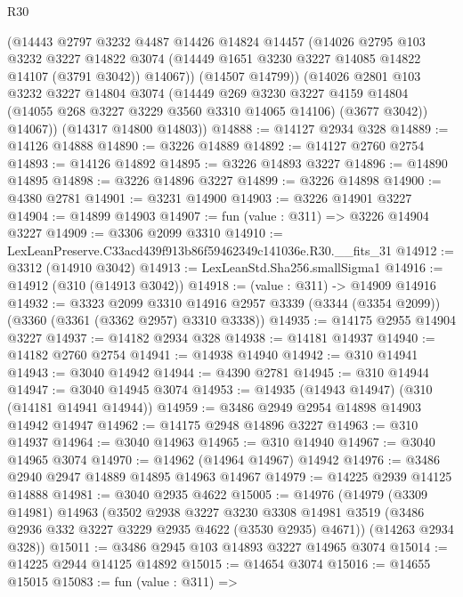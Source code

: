 \begin{lexlean}{R30}
\begin{coremodule}
          (@14443
            @2797
            @3232
            @4487
            @14426
            @14824
            @14457
            (@14026
              @2795
              @103
              @3232
              @3227
              @14822
              @3074
              (@14449 @1651 @3230 @3227 @14085 @14822 @14107 (@3791 @3042))
              @14067))
          (@14507 @14799))
        (@14026
          @2801
          @103
          @3232
          @3227
          @14804
          @3074
          (@14449
            @269
            @3230
            @3227
            @4159
            @14804
            (@14055 @268 @3227 @3229 @3560 @3310 @14065 @14106)
            (@3677 @3042))
          @14067))
      (@14317 @14800 @14803))
@14888 := @14127 @2934 @328
@14889 := @14126 @14888
@14890 := @3226 @14889
@14892 := @14127 @2760 @2754
@14893 := @14126 @14892
@14895 := @3226 @14893 @3227
@14896 := @14890 @14895
@14898 := @3226 @14896 @3227
@14899 := @3226 @14898
@14900 := @4380 @2781
@14901 := @3231 @14900
@14903 := @3226 @14901 @3227
@14904 := @14899 @14903
@14907 := fun (value : @311) => @3226 @14904 @3227
@14909 := @3306 @2099 @3310
@14910 := LexLeanPreserve.C33acd439f913b86f59462349c141036e.R30.__fits_31
@14912 := @3312 (@14910 @3042)
@14913 := LexLeanStd.Sha256.smallSigma1
@14916 := @14912 (@310 (@14913 @3042))
@14918 := (value : @311) -> @14909 @14916
@14932 := @3323
    @2099
    @3310
    @14916
    @2957
    @3339
    (@3344 (@3354 @2099))
    (@3360 (@3361 (@3362 @2957) @3310 @3338))
@14935 := @14175 @2955 @14904 @3227
@14937 := @14182 @2934 @328
@14938 := @14181 @14937
@14940 := @14182 @2760 @2754
@14941 := @14938 @14940
@14942 := @310 @14941
@14943 := @3040 @14942
@14944 := @4390 @2781
@14945 := @310 @14944
@14947 := @3040 @14945 @3074
@14953 := @14935 (@14943 @14947) (@310 (@14181 @14941 @14944))
@14959 := @3486 @2949 @2954 @14898 @14903 @14942 @14947
@14962 := @14175 @2948 @14896 @3227
@14963 := @310 @14937
@14964 := @3040 @14963
@14965 := @310 @14940
@14967 := @3040 @14965 @3074
@14970 := @14962 (@14964 @14967) @14942
@14976 := @3486 @2940 @2947 @14889 @14895 @14963 @14967
@14979 := @14225 @2939 @14125 @14888
@14981 := @3040 @2935 @4622
@15005 := @14976
    (@14979
      (@3309 @14981)
      @14963
      (@3502
        @2938
        @3227
        @3230
        @3308
        @14981
        @3519
        (@3486 @2936 @332 @3227 @3229 @2935 @4622 (@3530 @2935) @4671))
      (@14263 @2934 @328))
@15011 := @3486 @2945 @103 @14893 @3227 @14965 @3074
@15014 := @14225 @2944 @14125 @14892
@15015 := @14654 @3074
@15016 := @14655 @15015
@15083 := fun (value : @311) =>

\end{coremodule}
\end{lexlean}
